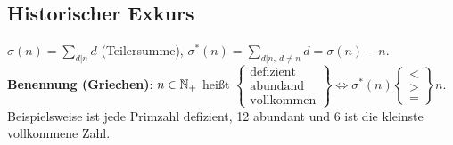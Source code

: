 \documentclass[a4paper,twoside,DIV15,BCOR12mm]{scrbook}
\begin{document}
\subsection*{Historischer Exkurs}
$\sigma(n)=\sum_{d|n} d$ (Teilersumme), $\sigma^*(n)=\sum_{d|n,\
d\neq n} d=\sigma(n)-n$.\\
\textbf{Benennung (Griechen)}: $n\in \mathbb{N}_+$ heißt
$\left\{\begin{matrix}\text{defizient}\\\text{abundand}\\\text{vollkommen}
\end{matrix}\right\}\iff \sigma^* (n) \left\{\begin{matrix}
<\\>\\=\end{matrix}\right\}n$.\\
Beispielsweise ist jede Primzahl defizient, 12 abundant und 6 ist die kleinste vollkommene Zahl.
\end{document}
